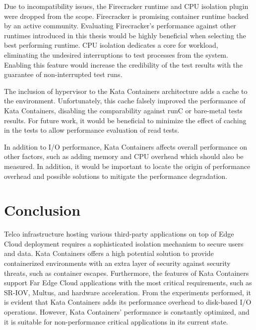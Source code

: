 Due to incompatibility issues, the Firecracker runtime and CPU isolation plugin were dropped from the scope. Firecracker is promising container runtime backed by an active community. Evaluating Firecracker's performance against other runtimes introduced in this thesis would be highly beneficial when selecting the best performing runtime. CPU isolation dedicates a core for workload, eliminating the undesired interruptions to test processes from the system. Enabling this feature would increase the credibility of the test results with the guarantee of non-interrupted test runs.

The inclusion of hypervisor to the Kata Containers architecture adds a cache to the environment. Unfortunately, this cache falsely improved the performance of Kata Containers, disabling the comparability against runC or bare-metal tests results. For future work, it would be beneficial to minimize the effect of caching in the tests to allow performance evaluation of read tests.

In addition to I/O performance, Kata Containers affects overall performance on other factors, such as adding memory and CPU overhead which should also be measured. In addition, it would be important to locate the origin of performance overhead and possible solutions to mitigate the performance degradation.

\section{Conclusion}

Telco infrastructure hosting various third-party applications on top of Edge Cloud deployment requires a sophisticated isolation mechanism to secure users and data. Kata Containers offers a high potential solution to provide containerized environments with an extra layer of security against security threats, such as container escapes. Furthermore, the features of Kata Containers support Far Edge Cloud applications with the most critical requirements, such as SR-IOV, Multus, and hardware acceleration. From the experiments performed, it is evident that Kata Containers adds its performance overhead to disk-based I/O operations. However, Kata Containers' performance is constantly optimized, and it is suitable for non-performance critical applications in its current state.